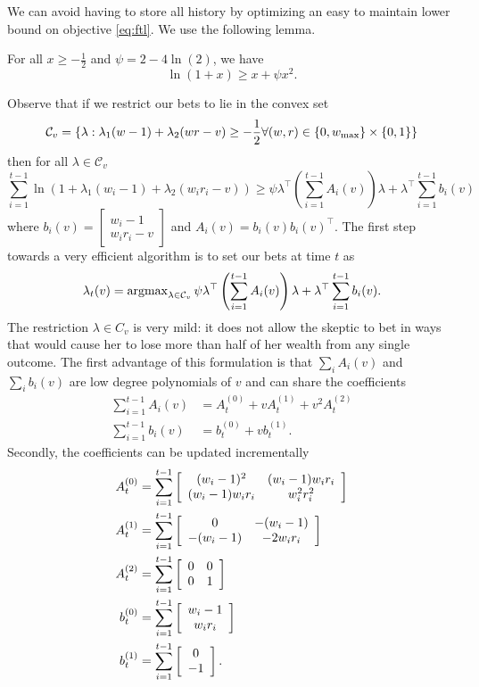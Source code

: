 We can avoid having to store all history by optimizing
an easy to maintain lower bound on objective \eqref{eq:ftl}.
We use the following lemma.
\begin{lemma} 
\label{lem:quadbound}
For all $x\geq -\frac{1}{2}$ and $\psi=2-4\ln(2)$, we have
\[
\ln(1+x)\geq x + \psi x^2.
\]
\end{lemma}
Observe that if we restrict our bets to lie in the convex set
\begin{equation}
\mathcal{C}_v = \{\lambda: \lambda_1 (w-1)+\lambda_2 (wr -v ) \geq -\frac{1}{2} \\ \forall (w,r) \in \{0,w_{\max}\}\times \{0,1\} \}
\label{eq:quadfeasible}
\end{equation}
then for all $\lambda \in \mathcal{C}_v$
\[
\sum_{i=1}^{t-1} \ln(1+\lambda_1 (w_i-1)+\lambda_2(w_i r_i - v)) 
\geq
\psi  
\lambda^\top \left(\sum_{i=1}^{t-1} A_i(v)\right) \lambda + \lambda^\top \sum_{i=1}^{t-1} b_i(v)
\]
where 
$b_i(v)=
\left[\begin{array}{c} 
w_i-1 \\ w_i r_i -v 
\end{array}\right] 
$
and 
$
A_i(v) = b_i(v)b_i(v)^\top.
$
The first step towards a very efficient algorithm is to 
set our bets at time $t$ as
\begin{equation}
\lambda_t(v) = \operatorname{argmax}_{\lambda \in \mathcal{C}_v}
\psi  \lambda^\top \left(\sum_{i=1}^{t-1} A_i(v)\right) \lambda 
+ \lambda^\top \sum_{i=1}^{t-1} b_i(v).
\label{eq:quadoptv}
\end{equation}
The restriction $\lambda \in C_v$ is very mild: it does 
not allow the skeptic to bet in ways that would cause her 
to lose more than half of her wealth from any single outcome.
The first advantage of this formulation is that 
$\sum_i A_i(v)$ and $\sum_i b_i(v)$ are low degree 
polynomials of $v$ and can share the coefficients
    \begin{align*}
        \sum_{i=1}^{t-1} A_i(v) &= 
        A_t^{(0)} + v A_t^{(1)} + v^2 A_t^{(2)}\\   
        \sum_{i=1}^{t-1} b_i(v) &= b_t^{(0)} + v b_t^{(1)}.  
    \end{align*}
Secondly, the coefficients can be updated incrementally
    \begin{align}
        A_t^{(0)} &=\sum_{i=1}^{t-1}\left[\begin{array}{cc} (w_i-1)^2 & (w_i-1)w_i r_i \\ (w_i-1)w_i r_i & w_i^2r_i^2 \end{array}\right] \label{eq:upsuffa0}\\
        A_t^{(1)} &= \sum_{i=1}^{t-1} \left[\begin{array}{cc} 0 & -(w_i-1) \\ -(w_i-1) & -2w_ir_i \end{array}\right]\\
        A_t^{(2)} &=\sum_{i=1}^{t-1}  \left[\begin{array}{cc} 0 & 0 \\ 0 & 1 \end{array}\right]\\
        b_t^{(0)} &=\sum_{i=1}^{t-1}  \left[\begin{array}{c} w_i-1 \\ w_ir_i \end{array}\right]\\
        b_t^{(1)} &=\sum_{i=1}^{t-1}  \left[\begin{array}{c} 0 \\ -1 \end{array}\right]. \label{eq:upsuffb1}
    \end{align}
